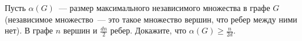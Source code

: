 Пусть $\alpha(G)$~--- размер максимального независимого множества в графе $G$ (независимое множество~---
это такое множество вершин, что ребер между ними нет). В графе $n$ вершин и $\frac{d n}{2}$
ребер. Докажите, что $\alpha(G) \ge \frac{n}{2d}$.
